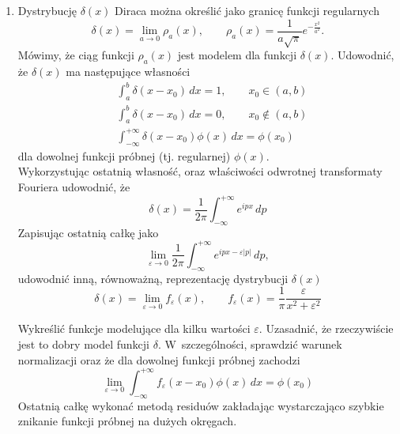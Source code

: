 \documentclass[a4paper,11pt]{article}
\begin{document}
\begin{enumerate}

\item Dystrybucję $\delta( x )$ Diraca można określić jako granicę funkcji
  regularnych
  \begin{equation}
    \label{QM:01}
    \delta( x ) = \lim_{ a \to 0 } \rho_{ a }( x ), \qquad
    \rho_{ a }( x ) =
    \frac{ 1 }{ a \sqrt{ \pi } } e^{ -\frac{ x^{ 2 } }{ a^{ 2 } } }.
  \end{equation}
  Mówimy, że ciąg funkcji $\rho_{ a }( x )$ jest modelem dla funkcji
  $\delta( x )$. Udowodnić, że $\delta( x )$ ma następujące własności
  \begin{align}
    &\int_{ a }^{ b } \delta( x - x_{ 0 } ) \, dx = 1, \qquad
      x_{ 0 } \in ( a, b ) \\
    &\int_{ a }^{ b } \delta( x - x_{ 0 } ) \, dx = 0, \qquad
      x_{ 0 } \notin ( a, b ) \\
    &\int_{ -\infty }^{ +\infty } \delta( x - x_{ 0 } ) \phi( x ) \, dx = \phi( x_{ 0 } )
  \end{align}
  dla dowolnej funkcji próbnej (tj. regularnej) $\phi( x )$. \\
  Wykorzystując ostatnią własność, oraz właściwości odwrotnej
  transformaty Fouriera udowodnić, że
  \begin{equation}
    \label{QM:02}
    \delta( x ) = \frac{ 1 }{ 2\pi } \int_{ -\infty }^{ +\infty } e^{ i p x } \, dp
  \end{equation}
  Zapisując ostatnią całkę jako
  \begin{equation}
    \label{QM:03}
    \lim_{ \varepsilon \to 0 } \frac{ 1 }{ 2\pi } \int_{ -\infty }^{ +\infty } e^{ ipx - \varepsilon | p | } \, dp,
  \end{equation}
  udowodnić inną, równoważną, reprezentację dystrybucji $\delta( x )$
  \begin{equation}
    \label{QM:04}
    \delta( x ) = \lim_{ \varepsilon \to 0 } f_{ \varepsilon }( x ), \qquad
    f_{ \varepsilon }( x ) = \frac{ 1 }{ \pi } \frac{ \varepsilon }{ x^{ 2 } + \varepsilon^{ 2 } }
  \end{equation}

  Wykreślić funkcje modelujące dla kilku wartości $\varepsilon$. Uzasadnić, że
  rzeczywiście jest to dobry model funkcji $\delta$. W~szczególności,
  sprawdzić warunek normalizacji oraz że dla dowolnej funkcji próbnej
  zachodzi
  \begin{equation}
    \label{QM:05}
    \lim_{ \varepsilon \to 0 } \int_{ -\infty }^{ +\infty } f_{ \varepsilon }( x - x_{ 0 } ) \phi( x ) \, dx
    =
    \phi( x_{ 0 } )
  \end{equation}
  Ostatnią całkę wykonać metodą residuów zakładając wystarczająco
  szybkie znikanie funkcji próbnej na dużych okręgach.


\end{enumerate}
\end{document}
